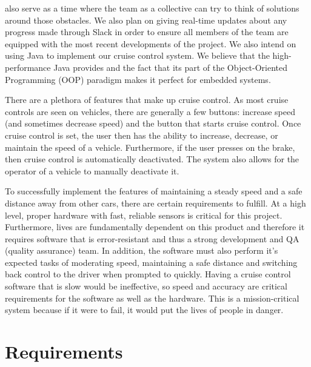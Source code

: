 \documentclass[preprint,11pt,3p]{article}
\begin{document}
also serve as a time where the team as a collective can try to think of solutions
around those obstacles. We also plan on giving real-time updates about any
progress made through Slack in order to ensure all members of the team are
equipped with the most recent developments of the project. We also intend on
using Java to implement our cruise control system. We believe that the
high-performance Java provides and the fact that its part of the Object-Oriented
Programming (OOP) paradigm makes it perfect for embedded systems. \par
There are a plethora of features that make up cruise control. As most cruise
controls are seen on vehicles, there are generally a few buttons: increase speed
(and sometimes decrease speed) and the button that starts cruise control. Once
cruise control is set, the user then has the ability to increase, decrease, or
maintain the speed of a vehicle. Furthermore, if the user presses on the brake,
then cruise control is automatically deactivated. The system also allows for the
operator of a vehicle to manually deactivate it. \par
To successfully implement the features of maintaining a steady speed and a
safe distance away from other cars, there are certain requirements to fulfill. At a
high level, proper hardware with fast, reliable sensors is critical for this project.
Furthermore, lives are fundamentally dependent on this product and therefore
it requires software that is error-resistant and thus a strong development and
QA (quality assurance) team. In addition, the software must also perform it’s
expected tasks of moderating speed, maintaining a safe distance and switching
back control to the driver when prompted to quickly. Having a cruise control
software that is slow would be ineffective, so speed and accuracy are critical
requirements for the software as well as the hardware. This is a mission-critical
system because if it were to fail, it would put the lives of people in danger.

\newpage
\section{Requirements}
\end{document}
